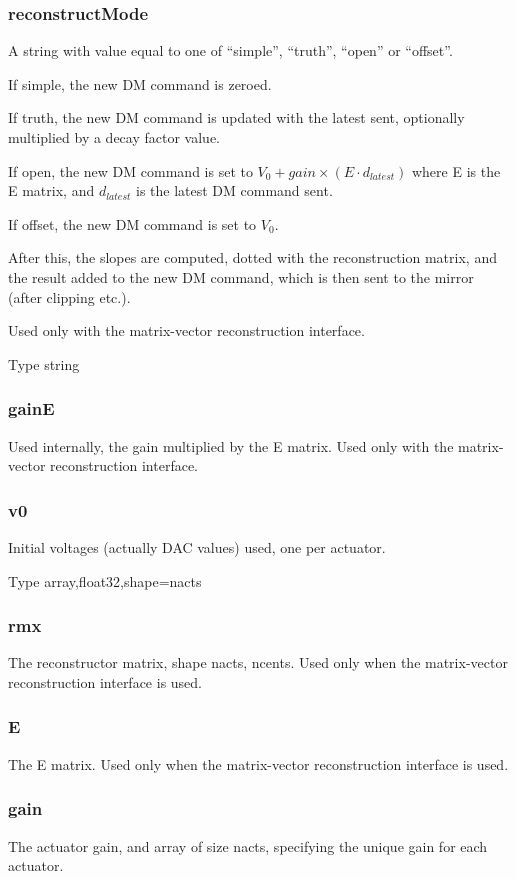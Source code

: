 \documentclass[a4,10pt]{article}
\begin{document}
\subsubsection{reconstructMode}
A string with value equal to one of ``simple'', ``truth'', ``open'' or
``offset''.  

If simple, the new DM command is zeroed.  

If truth, the new DM command is updated with the latest sent,
optionally multiplied by a decay factor value.

If open, the new DM command is set to $V_0 + gain \times (E \cdot
d_{latest})$ where E is the E matrix, and $d_{latest}$ is the latest DM
command sent.

If offset, the new DM command is set to $V_0$.

After this, the slopes are computed, dotted with the reconstruction
matrix, and the result added to the new DM command, which is then sent
to the mirror (after clipping etc.).

Used only with the matrix-vector
reconstruction interface.

Type string

\subsubsection{gainE}
Used internally, the gain multiplied by the E matrix.  Used only with the matrix-vector
reconstruction interface.

\subsubsection{v0}
Initial voltages (actually DAC values) used, one per actuator.

Type array,float32,shape=nacts

\subsubsection{rmx}
The reconstructor matrix, shape nacts, ncents.  Used only when the
matrix-vector reconstruction interface is used.

\subsubsection{E}
The E matrix.  Used only when the
matrix-vector reconstruction interface is used.

\subsubsection{gain}
The actuator gain, and array of size nacts, specifying the unique gain for
each actuator.  
\end{document}
